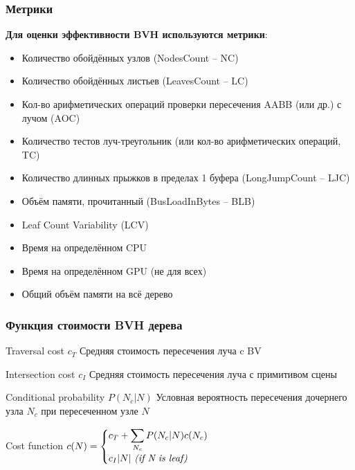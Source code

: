 \documentclass{beamer}
\begin{document}
\begin{frame}
    \frametitle{Метрики}
    \textbf{Для оценки эффективности BVH используются метрики}:
    \begin{itemize}
        \item
            Количество обойдённых узлов (NodesCount – NC)
        \item
            Количество обойдённых листьев (LeavesCount – LC)
        \item
            Кол-во арифметических операций проверки пересечения AABB (или др.) с лучом (AOC)
        \item
            Количество тестов луч-треугольник (или кол-во арифметических операций, TC)
        \item
            Количество длинных прыжков в пределах 1 буфера (LongJumpCount – LJC)
        \item
            Объём памяти, прочитанный (BusLoadInBytes – BLB)
        \item
            Leaf Count Variability (LCV)
        \item
            Время на определённом CPU
        \item
            Время на определённом GPU (не для всех)
        \item
            Общий объём памяти на всё дерево
    \end{itemize}
\end{frame}

\begin{frame}
    \frametitle{Функция стоимости BVH дерева}
    \begin{block}{Traversal cost \(c_T\) }
        Средняя стоимость пересечения луча c BV
    \end{block}
    \begin{block}{Intersection cost \(c_I\) }
        Средняя стоимость пересечения луча с примитивом сцены
    \end{block}
    \begin{block}{Conditional probability \(P(N_c\lvert N)\) }
        Условная вероятность пересечения дочернего узла \(N_c\) при пересеченном узле \(N\)
    \end{block}
    \begin{block}{Cost function}
        \(
        c(N) = \begin{cases}
            c_T + \displaystyle \sum_{N_c} P(N_c \lvert N)c(N_c)  \\
            c_I \lvert N \rvert\text{ \textit{(if N is leaf)} }
        \end{cases}
        \)
    \end{block}
\end{frame}
\end{document}
